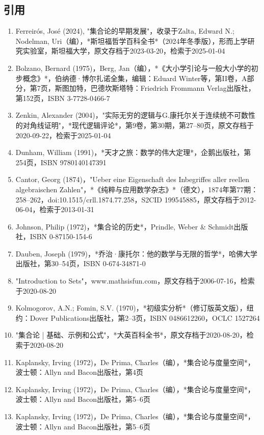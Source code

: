 \subsection{引用} 
\begin{enumerate}
\item Ferreirós, José (2024), "集合论的早期发展"，收录于Zalta, Edward N.; Nodelman, Uri（编），*斯坦福哲学百科全书*（2024年冬季版），形而上学研究实验室，斯坦福大学，原文存档于2023-03-20，检索于2025-01-04  
\item Bolzano, Bernard (1975)，Berg, Jan（编），*《大小学引论与一般大小学的初步概念》*，伯纳德·博尔扎诺全集，编辑：Eduard Winter等，第II卷，A部分，第7页，斯图加特，巴德坎斯塔特：Friedrich Frommann Verlag出版社，第152页，ISBN 3-7728-0466-7  
\item Zenkin, Alexander (2004)，"实际无穷的逻辑与G.康托尔关于连续统不可数性的对角线证明"，*现代逻辑评论*，第9卷，第30期，第27–80页，原文存档于2020-09-22，检索于2025-01-04
\item Dunham, William (1991)，*天才之旅：数学的伟大定理*，企鹅出版社，第254页，ISBN 9780140147391  
\item Cantor, Georg (1874)，"Ueber eine Eigenschaft des Inbegriffes aller reellen algebraischen Zahlen"，*《纯粹与应用数学杂志》*（德文），1874年第77期：258–262，doi:10.1515/crll.1874.77.258，S2CID 199545885，原文存档于2012-06-04，检索于2013-01-31
\item Johnson, Philip (1972)，*集合论的历史*，Prindle, Weber & Schmidt出版社，ISBN 0-87150-154-6  
\item Dauben, Joseph (1979)，*乔治·康托尔：他的数学与无限的哲学*，哈佛大学出版社，第30–54页，ISBN 0-674-34871-0  
\item "Introduction to Sets"，www.mathsisfun.com，原文存档于2006-07-16，检索于2020-08-20  
\item Kolmogorov, A.N.; Fomin, S.V. (1970)，*初级实分析*（修订版英文版），纽约：Dover Publications出版社，第2–3页，ISBN 0486612260，OCLC 1527264
\item "集合论 | 基础、示例和公式"，*大英百科全书*，原文存档于2020-08-20，检索于2020-08-20  
\item Kaplansky, Irving (1972)，De Prima, Charles（编），*集合论与度量空间*，波士顿：Allyn and Bacon出版社，第4页  
\item Kaplansky, Irving (1972)，De Prima, Charles（编），*集合论与度量空间*，波士顿：Allyn and Bacon出版社，第5–6页  
\item Kaplansky, Irving (1972)，De Prima, Charles（编），*集合论与度量空间*，波士顿：Allyn and Bacon出版社，第5–6页  

\end{enumerate}
